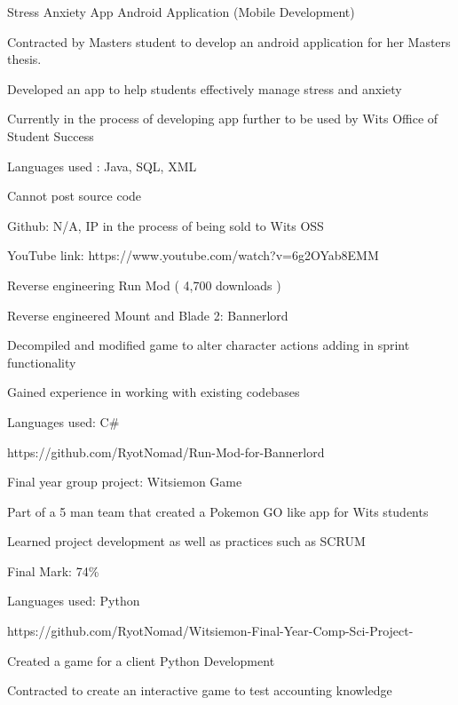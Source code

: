 \documentclass[]{awesome-cv}
\begin{document}
\begin{cventries}
	\cventry
	{Stress Anxiety App}
	{Android Application (Mobile Development)}
	{}
	{}
	{\begin{cvitems}
		\item {Contracted by Masters student to develop an android application for her Masters thesis.}
		\item {Developed an app to help students effectively manage stress and anxiety}
		\item {Currently in the process of developing app further to be used by Wits Office of Student Success}
		\item {Languages used : Java, SQL, XML}
		\item {Cannot post source code}
		\item {Github: N/A, IP in the process of being sold to Wits OSS}
		\item {YouTube link: https://www.youtube.com/watch?v=6g2OYab8EMM}
		\end{cvitems}}
	\cventry
	{Reverse engineering}
	{Run Mod ( 4,700 downloads )}
	{}
	{}
	{\begin{cvitems}
		\item {Reverse engineered Mount and Blade 2: Bannerlord}
		\item {Decompiled and modified game to alter character actions adding in sprint functionality}
		\item {Gained experience in working with existing codebases}
		\item {Languages used: C\#}
		\item {https://github.com/RyotNomad/Run-Mod-for-Bannerlord}
		\end{cvitems}}
	\cventry
	{Final year group project:}
	{Witsiemon Game}
	{}
	{}
	{\begin{cvitems}
		\item {Part of a 5 man team that created a Pokemon GO like app for Wits students}
		\item {Learned project development as well as practices such as SCRUM}
		\item {Final Mark: 74\%}
		\item {Languages used: Python}
		\item {https://github.com/RyotNomad/Witsiemon-Final-Year-Comp-Sci-Project-}
		\end{cvitems}}
	\cventry
	{Created a game for a client}
	{Python Development}
	{}
	{}
	{\begin{cvitems}
		\item {Contracted to create an interactive game to test accounting knowledge}

\end{cvitems}}
\end{cventries}
\end{document}
